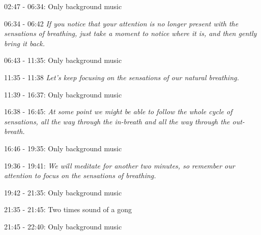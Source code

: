 02:47 - 06:34: Only background music

06:34 - 06:42 \textit{If you notice that your attention is no longer present with the sensations of breathing, just take a moment to notice where it is, and then gently bring it back. }

06:43 - 11:35: Only background music

11:35 - 11:38 \textit{Let's keep focusing on the sensations of our natural breathing.}

11:39 - 16:37: Only background music

16:38 - 16:45: \textit{At some point we might be able to follow the whole cycle of sensations, all the way through the in-breath and all the way through the out-breath. }

16:46 - 19:35: Only background music

19:36 - 19:41: \textit{We will meditate for another two minutes, so remember our attention to focus on the sensations of breathing.}

19:42 - 21:35: Only background music 

21:35 - 21:45: Two times sound of a gong  

21:45 - 22:40: Only background music 